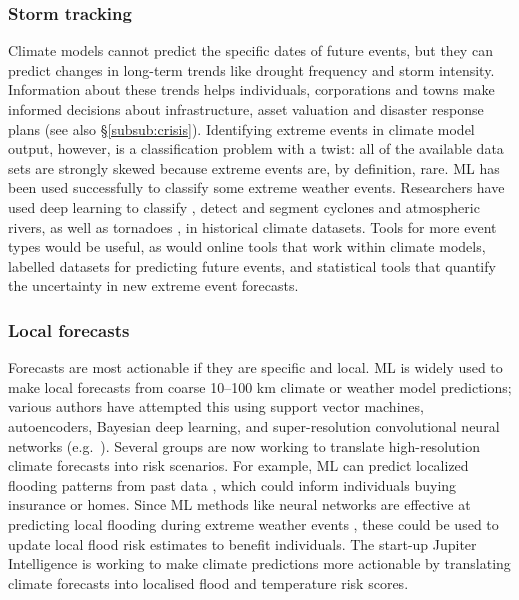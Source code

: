 \documentclass[11pt]{report}
\newcommand{\Gap}{\texorpdfstring{\hfill}{}}
\newcommand{\Rec}{\texorpdfstring{{\small\emph{\color{blue}{\fbox{High Leverage}}}}}{}}
\begin{document}
\subsubsection{Storm tracking}
Climate models cannot predict the specific dates of future events, but they can predict changes in long-term trends like drought frequency and storm intensity. Information about these trends helps individuals, corporations and towns make informed decisions about infrastructure, asset valuation and disaster response plans (see also \S\ref{subsub:crisis}). Identifying extreme events in climate model output, however, is a classification problem with a twist: all of the available data sets are strongly skewed because extreme events are, by definition, rare. ML has been used successfully to classify some extreme weather events.
Researchers have used deep learning to classify \cite{Liu2016}, detect \cite{Racah2017} and segment \cite{Kurth2018} cyclones and atmospheric rivers, as well as tornadoes \cite{Lakshmanan2010}, in historical climate datasets.
Tools for more event types would be useful, as would online tools that work within climate models, labelled datasets for predicting future events, and statistical tools that quantify the uncertainty in new extreme event forecasts.

\subsubsection{Local forecasts \Gap \Rec}
Forecasts are most actionable if they are specific and local. ML is widely used to make local forecasts from coarse 10--100 km climate or weather model predictions; various authors have attempted this using support vector machines, autoencoders, Bayesian deep learning, and super-resolution convolutional neural networks (e.g.~\cite{Li2019}). Several groups are now working to translate high-resolution climate forecasts into risk scenarios. For example, ML can predict localized flooding patterns from past data \cite{perignon2018patterns}, which could inform individuals buying insurance or homes. Since ML methods like neural networks are effective at predicting local flooding during extreme weather events \cite{sit2019decentralized}, these could be used to update local flood risk estimates to benefit individuals. The start-up Jupiter Intelligence
is working to make climate predictions more actionable by translating climate forecasts into localised flood and temperature risk scores.
\end{document}
